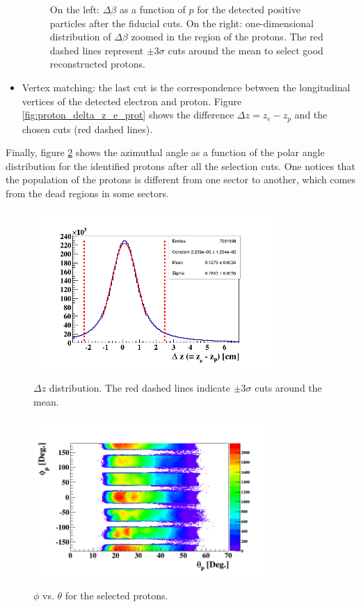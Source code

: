\begin{itemize}
\begin{figure}[tbp]
\caption{On the left: $\Delta \beta$ as a function of $p$ for the detected positive particles after the fiducial cuts. On the right: one-dimensional distribution of $\Delta \beta$ zoomed in the region of the protons. The red dashed lines represent $\pm$3$\sigma$ cuts around the mean to select good reconstructed protons.} 
\label{fig:proton_delta_beta_cuts}
\end{figure}

\item Vertex matching:  the last cut is the correspondence between the longitudinal vertices of the detected electron and proton. Figure \ref{fig:proton_delta_z_e_prot} shows the difference $\Delta z = z_{e} - z_{p}$ and the chosen cuts (red dashed lines).
\end{itemize}
Finally, figure \ref{fig:prot_Theta_Phi} shows the azimuthal angle as a function of the polar angle distribution for the identified protons after all the selection cuts. One notices that the population of the protons is different from one sector to another, which comes from the dead regions in some sectors.
\vspace{-0.1in}
 
\begin{figure}[tbp]
\begin{minipage}[c]{.46\linewidth}
\hspace{-0.3in}
\includegraphics[height=6.0cm]{fig_analysis/proton_delta_z_e_prot.png}
\caption{$\Delta z$ distribution. The red dashed lines indicate $\pm$3$\sigma$ cuts around the mean. } 
\label{fig:proton_delta_z_e_prot}
\end{minipage} \hfill
\begin{minipage}[c]{.46\linewidth}
\hspace{-0.3in}
\includegraphics[height=6.0cm]{fig_analysis/prot_Theta_Phi_2.png}
\caption{$\phi$ vs. $\theta$ for the selected protons.}
\vspace{0.2in}
\label{fig:prot_Theta_Phi}
\end{minipage}
\end{figure}

